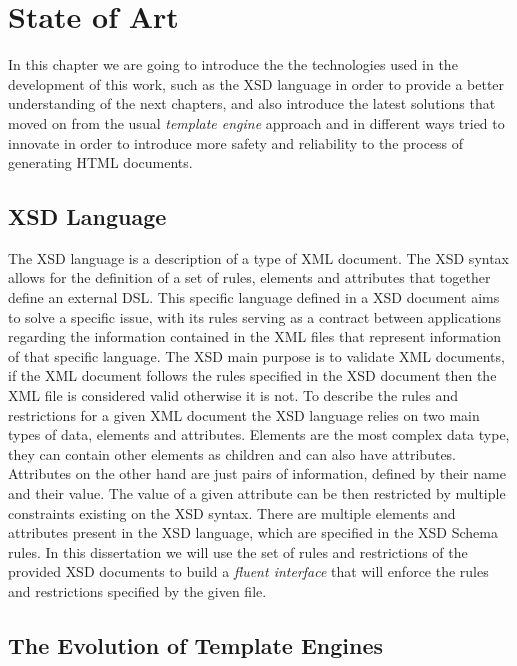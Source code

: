 \chapter{State of Art}
\label{cha:stateofart}

In this chapter we are going to introduce the the technologies used in the development of this work, such as the \ac{XSD} language in order to provide a better understanding of the next chapters, and also introduce the latest solutions that moved on from the usual \textit{template engine} approach and in different ways tried to innovate in order to introduce more safety and reliability to the process of generating \ac{HTML} documents. 

\section{XSD Language} %
\label{sec:xsd}

The \ac{XSD} language is a description of a type of \ac{XML} document. The \ac{XSD} syntax allows for the definition of a set of rules, elements and attributes that together define an external \ac{DSL}. This specific language defined in a \ac{XSD} document aims to solve a specific issue, with its rules serving as a contract between applications regarding the information contained in the \ac{XML} files that represent information of that specific language. The \ac{XSD} main purpose is to validate \ac{XML} documents, if the \ac{XML} document follows the rules specified in the \ac{XSD} document then the \ac{XML} file is considered valid otherwise it is not. To describe the rules and restrictions for a given \ac{XML} document the \ac{XSD} language relies on two main types of data, elements and attributes. Elements are the most complex data type, they can contain other elements as children and can also have attributes. Attributes on the other hand are just pairs of information, defined by their name and their value. The value of a given attribute can be then restricted by multiple constraints existing on the \ac{XSD} syntax. There are multiple elements and attributes present in the \ac{XSD} language, which are specified in the \ac{XSD} Schema rules\cite{xsdrules}. In this dissertation we will use the set of rules and restrictions of the provided \ac{XSD} documents to build a \textit{fluent interface} that will enforce the rules and restrictions specified by the given file.

\section{The Evolution of Template Engines}
\label{sec:templateenginesevolution}

